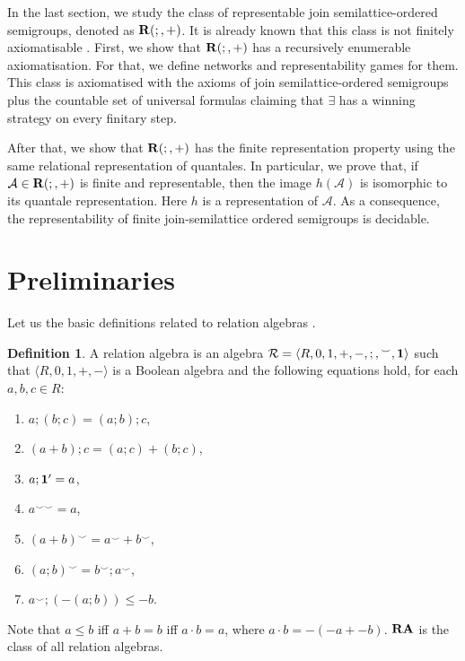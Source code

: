 \documentclass[a4paper]{article}
\theoremstyle{definition}
\newtheorem{definition}{Definition}
\theoremstyle{theorem}
\theoremstyle{proposition}
\theoremstyle{lemma}
\theoremstyle{ex}
\theoremstyle{corollary}
\theoremstyle{claim}
\begin{document}
In the last section, we study the class of representable join semilattice-ordered semigroups, denoted as ${\bf R}(;,+)$. It is
already known that this class is not finitely axiomatisable \cite{andreka2011axiomatizability}.
First, we show that ${\bf R}(;,+)$ has a recursively enumerable axiomatisation. For that,
we define networks and representability games for them. This class is axiomatised with the axioms of join semilattice-ordered semigroups plus the countable set of universal formulas claiming that
$\exists$ has a winning strategy on every finitary step.

After that, we show that ${\bf R}(;,+)$ has the finite representation property using the same relational representation of quantales. In particular, we prove that, if $\mathcal{A} \in {\bf R}(;,+)$ is finite and representable, then the image $h(\mathcal{A})$ is isomorphic to its quantale representation. Here $h$ is a representation of $\mathcal{A}$. As a consequence, the representability of finite join-semilattice ordered semigroups is decidable.

\section{Preliminaries}

Let us the basic definitions related to relation algebras \cite{hirsch2002relation}.
\begin{definition} A relation algebra is an algebra $\mathcal{R} = \langle R, 0, 1, +, -, ;, {}^{\smile}, {\bf 1 }\rangle$ such that $\langle R, 0, 1, +, - \rangle$ is a Boolean algebra and the following equations hold, for each $a, b, c \in R$:
    \begin{enumerate}
      \item $a ; (b ; c) = (a ; b) ; c$,
      \item $(a + b) ; c = (a ; c) + (b ; c)$,
      \item $a ; {\bf 1}' = a$,
      \item $a^{\smile \smile} = a$,
      \item $(a + b)^{\smile} = a^{\smile} + b^{\smile}$,
      \item $(a ; b)^{\smile} = b^{\smile} ; a^{\smile}$,
      \item $a^{\smile} ; (- (a ; b)) \leq - b$.
    \end{enumerate}
Note that $a \leq b$ iff $a + b = b$ iff $a \cdot b = a$, where $a \cdot b = - (- a + - b)$. ${\bf RA}$ is the class of all relation algebras.
\end{definition}
\end{document}
